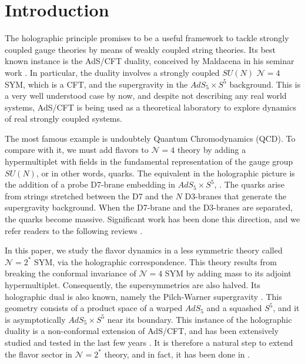 \section{Introduction}

The holographic principle promises to be a useful framework to tackle strongly coupled gauge theories by means of weakly coupled string theories. Its best known instance is the AdS/CFT duality, conceived by Maldacena in his seminar work \cite{Maldacena:1997re}. In particular, the duality involves a strongly coupled $SU(N)$ $\mathcal{N}=4$ SYM, which is a CFT, and the supergravity in the $AdS_5 \times S^5$ background. This is a very well understood case by now, and despite not describing any real world systems, AdS/CFT is being used as a theoretical laboratory to explore dynamics of real strongly coupled systems.

The most famous example is undoubtely Quantum Chromodynamics (QCD). To compare with it, we must add flavors to $\mathcal{N}=4$ theory by adding a hypermultiplet with fields in the fundamental representation of the gauge group $SU(N)$, or in other words, quarks. The equivalent in the holographic picture is the addition of a probe D7-brane embedding in $AdS_5 \times S^5$, \cite{Karch:2002sh}. The quarks arise from strings stretched between the D7 and the $N$ D3-branes that generate the supergravity background. When the D7-brane and the D3-branes are separated, the quarks become massive. Significant work has been done this direction, and we refer readers to the following reviews \cite{CasalderreySolana:2011us, Erdmenger:2007cm}.

In this paper, we study the flavor dynamics in a less symmetric theory called $\mathcal{N}=2^*$ SYM, via the holographic correspondence. This theory results from breaking the conformal invariance of $\mathcal{N}=4$ SYM by adding mass to its adjoint hypermultiplet. Consequently, the supersymmetries are also halved. Its holographic dual is also known, namely the Pilch-Warner supergravity \cite{Pilch:2000ue, Pilch:2003jg}. This geometry consists of a product space of a warped $AdS_5$ and a squashed $S^5$, and it is asymptotically $AdS_5 \times S^5$ near its boundary. This instance of the holographic duality is a non-conformal extension of AdS/CFT, and has been extensively studied and tested in the last few years \cite{Buchel:2013id, Chen-Lin:2015xlh, Chen-Lin:2017pay, Russo:2019lgq}. It is therefore a natural step to extend the flavor sector in $\mathcal{N}=2^*$ theory, and in fact, it has been done in \cite{Albash:2011nw}. 

